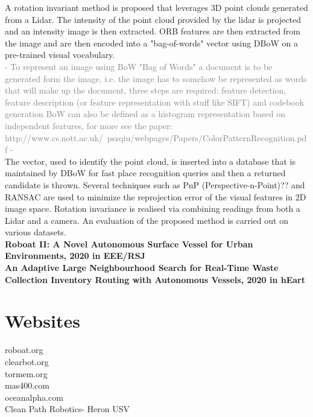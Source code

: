 \documentclass{article}
\begin{document}
A rotation invariant method is proposed that leverages 3D point clouds generated from a Lidar. The intensity of the point cloud provided by the lidar is projected and an intensity image is then extracted. ORB features are then extracted from the image and are then encoded into a "bag-of-words" vector using DBoW on a pre-trained visual vocabulary. 
\\
\textcolor{gray}{- To represent an image using BoW "Bag of Words" a document is to be generated form the image, i.e. the image has to somehow be represented as words that will make up the document, three steps are required: feature detection, feature description (or feature representation with stuff like SIFT) and codebook generation BoW can also be defined as a histogram representation based on independent features, for more see the paper:
\\ http://www.cs.nott.ac.uk/~pszqiu/webpages/Papers/ColorPatternRecognition.pdf -}
\\
The vector, used to identify the point cloud, is inserted into a database that is maintained by DBoW for fast place recognition queries and then a returned candidate is thrown. Several techniques such as PnP (Perspective-n-Point)?? and RANSAC are used to minimize the reprojection error of the visual features in 2D image space. Rotation invariance is realised via combining readings from both a Lidar and a camera. An evaluation of the proposed method is carried out on various datasets. 
\\
\textbf{Roboat II: A Novel Autonomous Surface Vessel for Urban Environments, 2020 in EEE/RSJ}
\\
\textbf{An Adaptive Large Neighbourhood Search for Real-Time Waste Collection
	Inventory Routing with Autonomous Vessels, 2020 in hEart}


	

\section{Websites}

roboat.org \\
clearbot.org \\
tormem.org \\
mas400.com \\
oceanalpha.com \\
Clean Path Robotics- Heron USV
\end{document}
